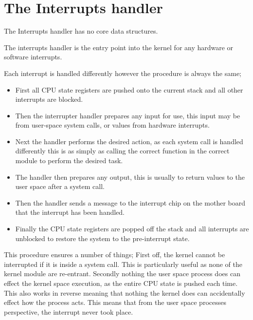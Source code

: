 \documentclass[a4paper]{report}
\begin{document}
\section{The Interrupts handler}

The Interrupts handler has no core data structures.

The interrupts handler is the entry point into the kernel for any hardware or software interrupts.

Each interrupt is handled differently however the procedure is always the same;

\begin{itemize}

\item First all CPU state registers are pushed onto the current stack and all other interrupts are blocked.

\item Then the interrupter handler prepares any input for use, this input may be from user-space system calls, or values from hardware interrupts.

\item Next the handler performs the desired action, as each system call is handled differently this is as simply as calling the correct function in the correct module to perform the desired task.

\item The handler then prepares any output, this is usually to return values to the user space after a system call.

\item Then the handler sends a message to the interrupt chip on the mother board that the interrupt has been handled.

\item Finally the CPU state registers are popped off the stack and all interrupts are unblocked to restore the system to the pre-interrupt state.

\end{itemize}

This procedure ensures a number of things; First off, the kernel cannot be interrupted if it is inside a system call. This is particularly useful as none of the kernel module are re-entrant. Secondly nothing the user space process does can effect the kernel space execution, as the entire CPU state is pushed each time. This also works in reverse meaning that nothing the kernel does can accidentally effect how the process acts. This means that from the user space processes perspective, the interrupt never took place.
\end{document}
